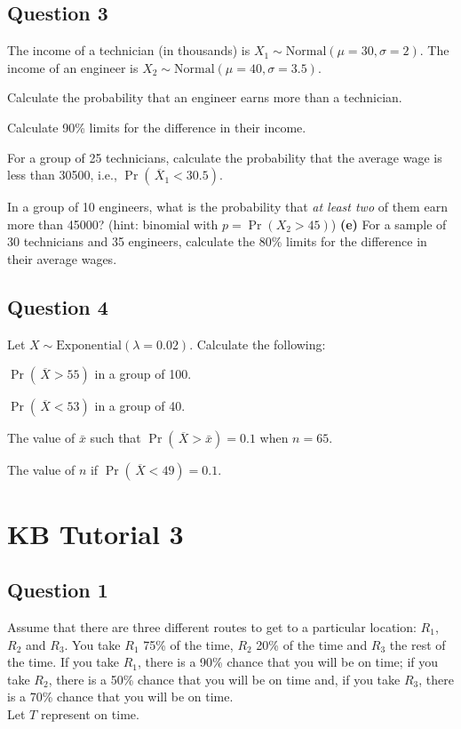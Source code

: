
\subsection*{Question 3}
The income of a technician (in thousands) is $X_1 \sim \text{Normal}(\mu=30,\sigma=2)$. The income of an engineer is $X_2 \sim \text{Normal}(\mu=40,\sigma=3.5)$. \\[-0.2cm]

\item  Calculate the probability that an engineer earns more than a technician. 
 \item  Calculate 90\% limits for the difference in their income. 
 \item  For a group of 25 technicians, calculate the probability that the average wage is less than 30500, i.e., $\Pr(\,\overline{\!X}_1 < 30.5)$. 
 \item  In a group of 10 engineers, what is the probability that \emph{at least two} of them earn more than 45000? (hint: binomial with $p = \Pr(X_2 > 45)$) 
 {\bf(e)} For a sample of 30 technicians and 35 engineers, calculate the 80\% limits for the difference in their average wages.


\subsection*{Question 4}
Let $X \sim \text{Exponential}(\lambda=0.02)$. Calculate the following:\\[-0.2cm]

\item  $\Pr(\,\overline{\!X} > 55)$ in a group of 100. 
 \item  $\Pr(\,\overline{\!X} < 53)$ in a group of 40. 
 \item  The value of $\bar x$ such that $\Pr(\,\overline{\!X} > \bar x) = 0.1$ when $n=65$. 
 \item  The value of $n$ if $\Pr(\,\overline{\!X} < 49) = 0.1$.



\section{KB Tutorial 3}
\subsection*{Question 1}
Assume that there are three different routes to get to a particular location: $R_1$, $R_2$ and $R_3$. You take $R_1$ 75\% of the time, $R_2$ 20\% of the time and $R_3$ the rest of the time. If you take $R_1$, there is a 90\% chance that you will be on time; if you take $R_2$, there is a 50\% chance that you will be on time and, if you take $R_3$, there is a 70\% chance that you will be on time. \\[0.1cm]
Let $T$ represent on time.\\[-0.2cm]


